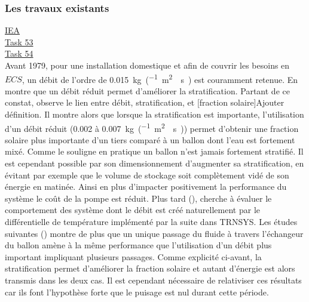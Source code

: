 \subsubsection{Les travaux existants} %
\label{ssub:les_travaux_existants}

\href{http://www.iea-shc.org/tasks-current}{IEA}\\
\href{http://task53.iea-shc.org/publications}{Task 53}\\
\href{http://task54.iea-shc.org/publications}{Task 54}\\

Avant 1979, pour une installation domestique et afin de couvrir les besoins
en $ECS$, un débit de l’ordre de \SI{0.015}{kg\per(\metre\squared\period\second)}
est couramment retenue. En  montre que un débit réduit
permet d’améliorer la stratification. Partant de ce constat, 
observe le lien entre débit, stratification, et [fraction solaire]{Ajouter définition}.
Il montre alors que lorsque la stratification est importante, l’utilisation d’un débit
réduit (\num{0.002} à \SI{0.007}{kg\per(\metre\squared\period\second)}) permet
d’obtenir une fraction solaire plus importante d’un tiers comparé à un ballon dont
l’eau est fortement mixé. Comme le souligne  en pratique
un ballon n’est jamais fortement stratifié. Il est cependant possible par son dimensionnement
d’augmenter sa stratification, en évitant par exemple que le volume de stockage soit
complètement vidé de son énergie en matinée. Ainsi en plus d’impacter positivement
la performance du système le coût de la pompe est réduit. Plus tard (),
cherche à évaluer le comportement des système dont le débit est créé naturellement
par le différentielle de température implémenté par la suite dans TRNSYS. Les études
suivantes () montre de plus que un unique
passage du fluide à travers l’échangeur du ballon amène à la même performance que
l’utilisation d’un débit plus important impliquant plusieurs passages. Comme explicité
ci-avant, la stratification permet d’améliorer la fraction solaire et autant d’énergie est
alors transmis dans les deux cas. Il est cependant nécessaire de relativiser ces
résultats car ils font l’hypothèse forte que le puisage est nul durant cette période.


